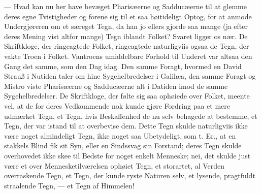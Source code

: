\documentclass[12pt,a4paper]{book}
\begin{document}
--- Hvad kan nu her have bevæget Pharisæerne og Sadducæerne til at glemme deres egne
Tvistigheder og forene sig til et saa høitideligt Optog, for at anmode Undergjøreren om
et særeget Tegn, da han jo ellers gjorde saa mange (ja efter deres Mening vist altfor
mange) Tegn iblandt Folket? Svaret ligger os nær. De Skriftkloge, der ringeagtede
Folket, ringeagtede naturligviis ogsaa de Tegn, der vakte Troen i Folket.
Vantroens umiddelbare Forhold til Underet var altsaa den Gang det samme, som den Dag
idag. Den samme Foragt, hvormed en David Strauß i Nutiden taler om hine
Sygehelbredelser i Galilæa, den samme Foragt og Mistro viste Pharisæerne og
Sadducæerne alt i Datiden imod de samme Sygehelbredelser. De Skriftkloge, der følte sig
saa ophøiede over Folket, meente vel, at de for deres Vedkommende nok kunde gjøre
Fordring paa et mere udmærket Tegn, et Tegn, hvis Beskaffenhed de nu selv behagede at
bestemme, et Tegn, der var istand til at overbevise dem. Dette Tegn skulde naturligviis
ikke være noget almindeligt Tegn, ikke noget saa Ubetydeligt, som t. Er., at en
stakkels Blind fik sit Syn, eller en Sindssvag sin Forstand; deres Tegn skulde
overhovedet ikke skee til Bedste for noget enkelt Menneske; nei, det skulde just være
et over Mennesketilværelsen ophøiet Tegn, et storartet, al Verden overraskende Tegn, et
Tegn, der kunde ryste Naturen selv, et lysende, pragtfuldt straalende Tegn, --- et Tegn
af Himmelen!
\end{document}
